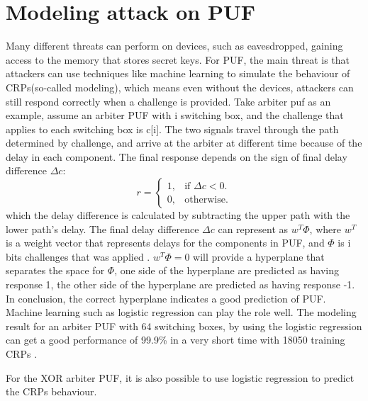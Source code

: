 \section{Modeling attack on PUF}
Many different threats can perform on devices, such as eavesdropped, gaining access to the memory that stores secret keys. For PUF, the main threat is that attackers can use techniques 
like machine learning to simulate the behaviour of CRPs(so-called modeling), which means even without the devices, attackers can still respond correctly when a challenge is 
provided. Take arbiter puf as an example, assume an arbiter PUF with i switching box, and the challenge that applies to each switching box is c[i]. The two signals travel through the 
path determined by challenge, and arrive at the arbiter at different time because of the delay in each component. The final response depends on the sign of final delay 
difference $\Delta c$:
\begin{equation}
    r =\begin{cases}
    1, & \text{if $\Delta c<0$}.\\
    0, & \text{otherwise}.
    \end{cases}
\end{equation}
which the delay difference is calculated by subtracting the upper path with the lower path's delay. The final delay difference $\Delta c$ can represent as $w^{T}\Phi$, where $w^{T}$ is 
a weight vector that represents delays for the components in PUF, and $\Phi$ is i bits challenges that was applied \cite{Reference5}. $w^{T}\Phi = 0$ will provide a hyperplane that separates the space for $\Phi$, one side of the hyperplane are predicted as having response 1, the other side of the hyperplane
are predicted as having response -1. In conclusion, the correct hyperplane indicates a good prediction of PUF. Machine learning such as logistic regression can play the role well. The modeling result for an arbiter PUF with 64 switching boxes, 
by using the logistic regression can get a good performance of 99.9\% in a very short time with 18050 training CRPs \cite{Reference6}.

For the XOR arbiter PUF, it is also possible to use logistic regression to predict the CRPs behaviour.

